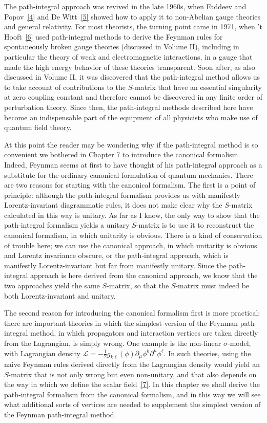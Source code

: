 The path-integral approach was revived in the late 1960s, when Faddeev and
Popov~\hyperref[ref:9.4]{[4]} and De Witt~\hyperref[ref:9.5]{[5]} showed how to apply it to non-Abelian gauge
theories and general relativity. For most theorists, the turning point came in
1971, when 't Hooft~\hyperref[ref:9.6]{[6]} used path-integral methods to derive the Feynman
rules for spontaneously broken gauge theories (discussed in Volume II),
including in particular the theory of weak and electromagnetic interactions,
in a gauge that made the high energy behavior of these theories transparent.
Soon after, as also discussed in Volume II, it was discovered that the
path-integral method allows us to take account of contributions to the
$S$-matrix that have an essential singularity at zero coupling constant and
therefore cannot be discovered in any finite order of perturbation theory.
Since then, the path-integral methods described here have become an
indispensable part of the equipment of all physicists who make use of
quantum field theory.

At this point the reader may be wondering why if the path-integral method
is so convenient we bothered in Chapter 7 to introduce the canonical
formalism. Indeed, Feynman seems at first to have thought of his path-integral
approach as a substitute for the ordinary canonical formulation of quantum
mechanics. There are two reasons for starting with the canonical formalism.
The first is a point of principle: although the path-integral formalism provides
us with manifestly Lorentz-invariant diagrammatic rules, it does not make
clear why the $S$-matrix calculated in this way is unitary. As far as I know,
the only way to show that the path-integral formalism yields a unitary
$S$-matrix is to use it to reconstruct the canonical formalism, in which
unitarity is obvious. There is a kind of conservation of trouble here; we can
use the canonical approach, in which unitarity is obvious and Lorentz
invariance obscure, or the path-integral approach, which is manifestly
Lorentz-invariant but far from manifestly unitary. Since the path-integral
approach is here derived from the canonical approach, we know that the two
approaches yield the same $S$-matrix, so that the $S$-matrix must indeed be
both Lorentz-invariant and unitary.

The second reason for introducing the canonical formalism first is more
practical: there are important theories in which the simplest version of the
Feynman path-integral method, in which propagators and interaction vertices
are taken directly from the Lagrangian, is simply wrong. One example is the
non-linear $\sigma$-model, with Lagrangian density
$\mathcal{L}=-\tfrac12 g_{k\ell}(\phi)\partial_\mu\phi^k\partial^\mu\phi^\ell$.
In such theories, using the naive Feynman rules derived directly from the
Lagrangian density would yield an $S$-matrix that is not only wrong but even
non-unitary, and that also depends on the way in which we define the scalar
field~\hyperref[ref:9.7]{[7]}. In this chapter we shall derive the path-integral formalism from the
canonical formalism, and in this way we will see what additional sorts of
vertices are needed to supplement the simplest version of the Feynman
path-integral method.

